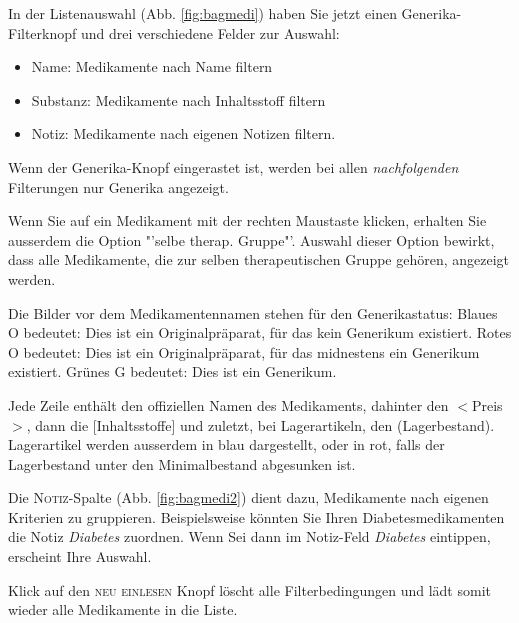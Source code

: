 \documentclass[a4paper]{scrartcl}
\begin{document}
In der Listenauswahl (Abb. \ref{fig:bagmedi}) haben Sie jetzt einen Generika-Filterknopf und drei verschiedene Felder zur Auswahl:
\begin{itemize}
    \item Name: Medikamente nach Name filtern
    \item Substanz: Medikamente nach Inhaltsstoff filtern
    \item Notiz: Medikamente nach eigenen Notizen filtern.
\end{itemize}
Wenn der Generika-Knopf eingerastet ist, werden bei allen \textit{nachfolgenden} Filterungen nur Generika angezeigt.

\medskip

Wenn Sie auf ein Medikament mit der rechten Maustaste klicken, erhalten Sie ausserdem die Option "'selbe therap. Gruppe"'. Auswahl dieser Option bewirkt, dass alle Medikamente, die zur selben therapeutischen Gruppe gehören, angezeigt werden.

Die Bilder vor dem Medikamentennamen stehen für den Generikastatus: Blaues O bedeutet: Dies ist ein Originalpräparat, für das kein Generikum existiert. Rotes O bedeutet: Dies ist ein Originalpräparat, für das midnestens ein Generikum existiert. Grünes G bedeutet: Dies ist ein Generikum.

 Jede Zeile enthält den offiziellen Namen des Medikaments, dahinter den $<$Preis$>$, dann die [Inhaltsstoffe] und zuletzt, bei Lagerartikeln, den (Lagerbestand). Lagerartikel werden ausserdem in blau dargestellt, oder in rot, falls der Lagerbestand unter den Minimalbestand abgesunken ist.

\medskip

Die \textsc{Notiz}-Spalte (Abb. \ref{fig:bagmedi2}) dient dazu, Medikamente nach eigenen Kriterien zu gruppieren. Beispielsweise könnten Sie \glqq{} Ihren\grqq{} Diabetesmedikamenten die Notiz \textit{Diabetes} zuordnen. Wenn Sei dann im Notiz-Feld \textit{Diabetes} eintippen, erscheint Ihre Auswahl.

\medskip

Klick auf den \textsc{neu einlesen} Knopf löscht alle Filterbedingungen und lädt somit wieder alle Medikamente in die Liste.
\end{document}
